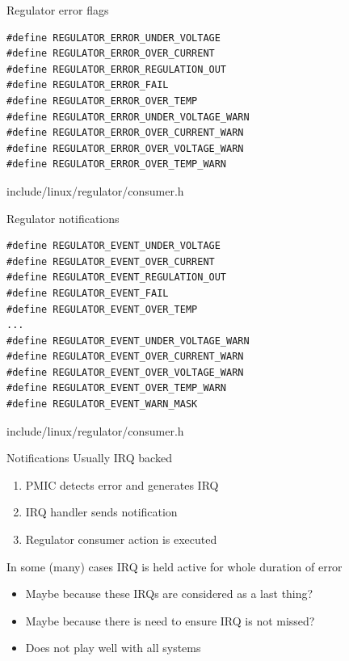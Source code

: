 \documentclass[10pt]{beamer}
\begin{document}

\begin{frame}[fragile]{Regulator error flags}
\begin{lstlisting}
#define REGULATOR_ERROR_UNDER_VOLTAGE
#define REGULATOR_ERROR_OVER_CURRENT
#define REGULATOR_ERROR_REGULATION_OUT
#define REGULATOR_ERROR_FAIL
#define REGULATOR_ERROR_OVER_TEMP
#define REGULATOR_ERROR_UNDER_VOLTAGE_WARN
#define REGULATOR_ERROR_OVER_CURRENT_WARN
#define REGULATOR_ERROR_OVER_VOLTAGE_WARN
#define REGULATOR_ERROR_OVER_TEMP_WARN
\end{lstlisting}
include/linux/regulator/consumer.h
\end{frame}


\begin{frame}[fragile]{Regulator notifications}
\begin{lstlisting}
#define REGULATOR_EVENT_UNDER_VOLTAGE
#define REGULATOR_EVENT_OVER_CURRENT
#define REGULATOR_EVENT_REGULATION_OUT
#define REGULATOR_EVENT_FAIL
#define REGULATOR_EVENT_OVER_TEMP
...
#define REGULATOR_EVENT_UNDER_VOLTAGE_WARN
#define REGULATOR_EVENT_OVER_CURRENT_WARN
#define REGULATOR_EVENT_OVER_VOLTAGE_WARN
#define REGULATOR_EVENT_OVER_TEMP_WARN
#define REGULATOR_EVENT_WARN_MASK
\end{lstlisting}
include/linux/regulator/consumer.h
\end{frame}


\begin{frame}{Notifications}
Usually IRQ backed
\begin{enumerate}
	\item PMIC detects error and generates IRQ
	\item IRQ handler sends notification
	\item Regulator consumer action is executed
\end{enumerate}
\pause
In some (many) cases IRQ is held active for whole duration of error
\begin{itemize}
	\item Maybe because these IRQs are considered as a last thing?
	\item Maybe because there is need to ensure IRQ is not missed?
	\item Does not play well with all systems
\end{itemize}
\end{frame}
\end{document}
